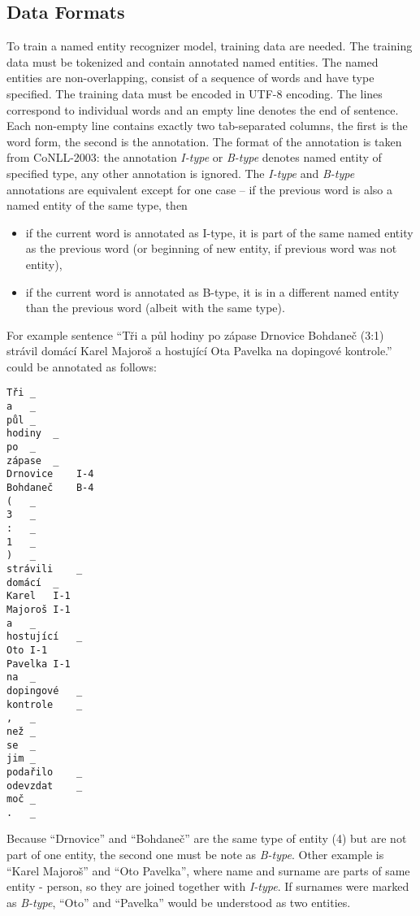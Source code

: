 \subsection{Data Formats}
To train a named entity recognizer model, training data are needed. The training
data must be tokenized and contain annotated named entities. The named entities
are non-overlapping, consist of a sequence of words and have type specified.
The training data must be encoded in UTF-8 encoding. The lines correspond to
individual words and an empty line denotes the end of sentence. Each non-empty
line contains exactly two tab-separated columns, the first is the word form, the
second is the annotation. The format of the annotation is taken from CoNLL-2003:
the annotation {\it I-type} or {\it B-type} denotes named entity of specified
type, any other annotation is ignored. The {\it I-type} and {\it B-type}
annotations are equivalent except for one case – if the previous word is also a
named entity of the same type, then
\begin{itemize}
\item{}if the current word is annotated as I-type, it is part of the same named
entity as the previous word (or beginning of new entity, if previous word was
not entity),
\item{}if the current word is annotated as B-type, it is in a different named
entity than the previous word (albeit with the same type).
\end{itemize}

For example sentence ``Tři a půl hodiny po zápase Drnovice Bohdaneč (3:1) strávil domácí Karel Majoroš a hostující Ota Pavelka na dopingové kontrole.''
could be annotated as follows:

\begin{lstlisting}[frame=single]
Tři	_
a	_
půl	_
hodiny	_
po	_
zápase	_
Drnovice	I-4
Bohdaneč	B-4
(	_
3	_
:	_
1	_
)	_
strávili	_
domácí	_
Karel	I-1
Majoroš	I-1
a	_
hostující	_
Oto	I-1
Pavelka	I-1
na	_
dopingové	_
kontrole	_
,	_
než	_
se	_
jim	_
podařilo	_
odevzdat	_
moč	_
.	_
\end{lstlisting}

Because ``Drnovice'' and ``Bohdaneč'' are the same type of entity (4) but are
not part of one entity, the second one must be note as \emph{B-type}.
Other example is ``Karel Majoroš'' and ``Oto Pavelka'', where name and surname
are parts of same entity - person, so they are joined together with \emph{I-type}.
If surnames were marked as {\it B-type}, ``Oto'' and ``Pavelka'' would be
understood as two entities.
